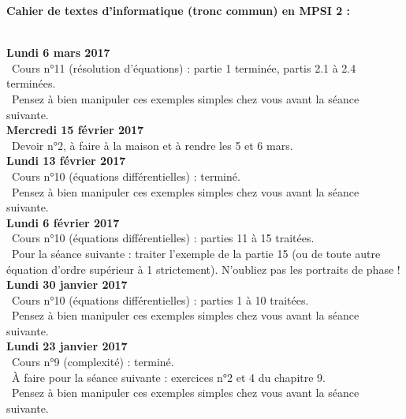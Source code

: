 \documentclass[12pt,a4paper]{article}
\begin{document}
\begin{center}
\Large\bf Cahier de textes d'informatique (tronc commun) en MPSI 2 :
\end{center}
\vspace{1cm}
\vspace{.4cm}\\

\noindent\textbf{Lundi 6 mars 2017}\\
\bu\ Cours n°11 (résolution d'équations) : partie 1 terminée, partis 2.1 à 2.4 terminées. \\
\bu\ Pensez à bien manipuler ces exemples simples chez vous avant la séance suivante. \vspace{.4cm}\\

\noindent\textbf{Mercredi 15 février 2017}\\
\bu\ Devoir n°2, à faire à la maison et à rendre les 5 et 6 mars. \vspace{.4cm}\\

\noindent\textbf{Lundi 13 février 2017}\\
\bu\ Cours n°10 (équations différentielles) : terminé. \\
\bu\ Pensez à bien manipuler ces exemples simples chez vous avant la séance suivante. \vspace{.4cm}\\

\noindent\textbf{Lundi 6 février 2017}\\
\bu\ Cours n°10 (équations différentielles) : parties 11 à 15 traitées. \\
\bu\ Pour la séance suivante : traiter l'exemple de la partie 15 (ou de toute autre équation d'ordre supérieur à 1 strictement). N'oubliez pas les portraits de phase ! \vspace{.4cm}\\

\noindent\textbf{Lundi 30 janvier 2017}\\
\bu\ Cours n°10 (équations différentielles) : parties 1 à 10 traitées. \\
\bu\ Pensez à bien manipuler ces exemples simples chez vous avant la séance suivante. \vspace{.4cm}\\

\noindent\textbf{Lundi 23 janvier 2017}\\
\bu\ Cours n°9 (complexité) : terminé. \\
\bu\ À faire pour la séance suivante : exercices n°2 et 4 du chapitre 9.\\
\bu\ Pensez à bien manipuler ces exemples simples chez vous avant la séance suivante. \vspace{.4cm}\\
\end{document}
